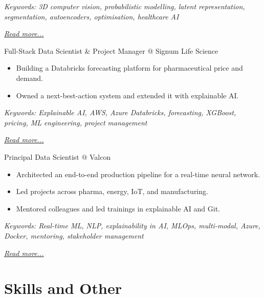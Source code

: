 \documentclass[11pt,a4paper]{moderncv}
\begin{document}
{\footnotesize\textit{Keywords: 3D computer vision, probabilistic modelling, latent representation, segmentation, autoencoders, optimisation, healthcare AI}}

\hfill{\small{\textit{\hyperref[sec:raysearch]{Read more...}}}}

\large{Full-Stack Data Scientist \& Project Manager @ Signum Life Science}
\normalsize
\begin{itemize}
    \item Building a Databricks forecasting platform for pharmaceutical price and demand.
    \item Owned a next-best-action system and extended it with explainable AI.
\end{itemize}

{\footnotesize\textit{Keywords: Explainable AI, AWS, Azure Databricks, forecasting, XGBoost, pricing, ML engineering, project management}}

\hfill{\small{\textit{\hyperref[sec:signum]{Read more...}}}}

\large{Principal Data Scientist @ Valcon}
\normalsize
\begin{itemize}
    \item Architected an end-to-end production pipeline for a real-time neural network.
    \item Led projects across pharma, energy, IoT, and manufacturing.
    \item Mentored colleagues and led trainings in explainable AI and Git.
\end{itemize}

{\footnotesize\textit{Keywords: Real-time ML, NLP, explainability in AI, MLOps, multi-modal, Azure, Docker, mentoring, stakeholder management}}

\hfill{\small{\textit{\hyperref[sec:valcon]{Read more...}}}}

\section{Skills and Other}
\normalsize
{}

\newpage
\end{document}
